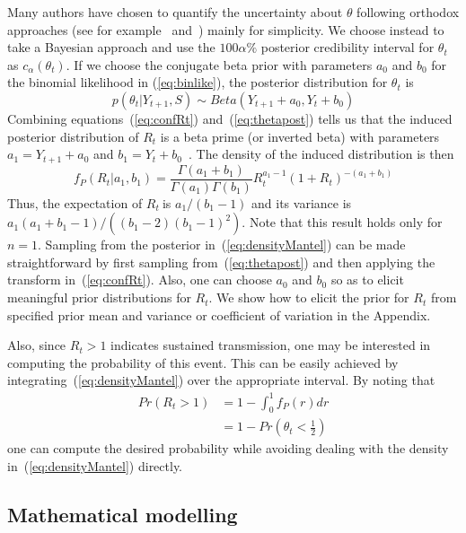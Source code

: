 \documentclass[10pt]{article}
\def \rr {$R_{t}\:$}
\begin{document}
Many authors have chosen to quantify the uncertainty about $\theta$ 
following orthodox approaches  (see for example~\cite{wilson} 
and~\cite{clopper}) mainly for simplicity.
We choose instead to take a Bayesian approach and use the  $100\alpha \%$ 
posterior credibility interval for $\theta_t$ as $c_{\alpha}(\theta_t)$.
If we choose the conjugate beta prior with parameters $a_0$ and $b_0$ for the 
binomial likelihood in (\ref{eq:binlike}), the posterior distribution for 
$\theta_t$ is
\begin{equation}
\label{eq:thetapost}
p(\theta_t| Y_{t+1}, S) \sim Beta(Y_{t+1} + a_0, Y_t + b_0)
\end{equation}
Combining equations~(\ref{eq:confRt}) and~(\ref{eq:thetapost}) 
tells us that the induced posterior distribution of $R_t$ is 
a beta prime (or inverted beta) with parameters $ a_1 = Y_{t+1} + a_0$ and $b_1 
=  Y_t + b_0$~\cite{dubey1970}.
The density of the induced distribution is then 
\begin{equation}
\label{eq:densityMantel}
f_P(R_t| a_1, b_1) = \frac{\Gamma(a_1 + b_1)}{\Gamma(a_1)\Gamma(b_1)} R_t^{a_1 
- 
1} (1 + R_t)^{-(a_1 + b_1)}
\end{equation}
Thus, the expectation of \rr is $a_1/(b_1 - 1)$ and its variance is 
$a_1(a_1 + b_1 - 1)/\left((b_1 - 2)(b_1 - 1)^2 \right) $.
Note that this result holds only for $n = 1$.
Sampling from the posterior in~(\ref{eq:densityMantel}) can be made 
straightforward by first sampling from~(\ref{eq:thetapost}) and then applying 
the transform in~(\ref{eq:confRt}).
Also, one can choose $a_0$ and $b_0$ so as to elicit meaningful prior 
distributions for $R_t$.
We show how to elicit the prior for $R_t$ from specified prior mean and variance
or coefficient of variation in the Appendix.

Also, since $R_t > 1$ indicates sustained transmission, one may be 
interested in computing the probability of this event.
This can be easily achieved by integrating~(\ref{eq:densityMantel}) over the 
appropriate interval.
By noting that
\begin{align}
\label{cumprobMantel}
Pr(R_t > 1) &= 1 - \int_0^1 f_P(r)dr \\
            &= 1- Pr(\theta_t < \frac{1}{2})
\end{align}
one can compute the desired probability while avoiding dealing with the density 
in~(\ref{eq:densityMantel}) directly.

\subsection*{Mathematical modelling} %
\end{document}

